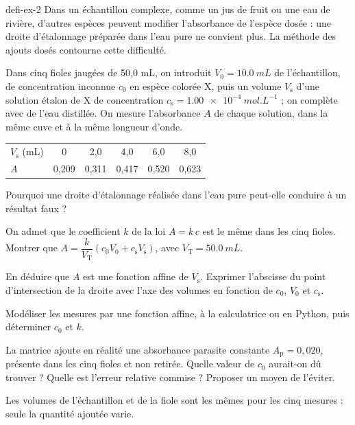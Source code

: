 \begin{blocEdition}{defi-ex-2}
Dans un échantillon complexe, comme un jus de fruit ou une eau de rivière, d'autres espèces peuvent modifier
l'absorbance de l'espèce dosée : une droite d'étalonnage préparée dans l'eau pure ne convient plus.
La méthode des ajouts dosés contourne cette difficulté.\par\smallskip
Dans cinq fioles jaugées de 50,0 mL, on introduit $V_0=\qty{10,0}{mL}$ de l'échantillon, de concentration inconnue
$c_0$ en espèce colorée X, puis un volume $V_\mathrm{s}$ d'une solution étalon de X de concentration
$c_\mathrm{s}=\qty{1,00e-4}{mol.L^{-1}}$ ; on complète avec de l'eau distillée. On mesure l'absorbance $A$
de chaque solution, dans la même cuve et à la même longueur d'onde.
\begin{center}\small\renewcommand{\arraystretch}{1.2}
\begin{tabular}{@{}l*{5}{c}@{}}\toprule
$V_\mathrm{s}$ (mL) & 0 & 2,0 & 4,0 & 6,0 & 8,0\\
$A$ & 0,209 & 0,311 & 0,417 & 0,520 & 0,623\\\bottomrule
\end{tabular}\end{center}
\begin{questions}
\item Pourquoi une droite d'étalonnage réalisée dans l'eau pure peut-elle conduire à un résultat faux ?
\item On admet que le coefficient $k$ de la loi $A=k\,c$ est le même dans les cinq fioles. Montrer que
$A=\dfrac{k}{V_\mathrm{T}}\left(c_0V_0+c_\mathrm{s}V_\mathrm{s}\right)$, avec $V_\mathrm{T}=\qty{50,0}{mL}$.
\item En déduire que $A$ est une fonction affine de $V_\mathrm{s}$. Exprimer l'abscisse du point d'intersection de
la droite avec l'axe des volumes en fonction de $c_0$, $V_0$ et $c_\mathrm{s}$.
\item Modéliser les mesures par une fonction affine, à la calculatrice ou en Python, puis déterminer $c_0$ et $k$.
\item La matrice ajoute en réalité une absorbance parasite constante $A_\mathrm{p}=0{,}020$, présente dans les cinq
fioles et non retirée. Quelle valeur de $c_0$ aurait-on dû trouver ? Quelle est l'erreur relative commise ?
Proposer un moyen de l'éviter.
\end{questions}
Les volumes de l'échantillon et de la fiole sont les mêmes pour les cinq mesures : seule la quantité ajoutée varie.
\end{blocEdition}

